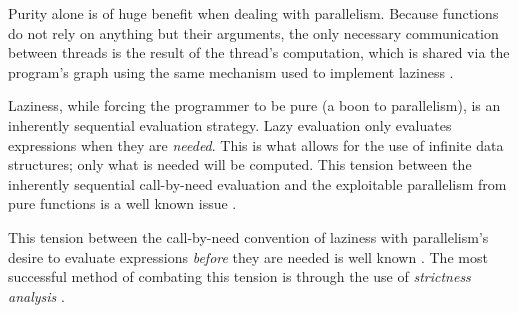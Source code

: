 
Purity alone is of huge benefit when dealing with parallelism. Because
functions do not rely on anything but their arguments, the only necessary communication
between threads is the result of the thread's computation, which is
shared via the program's graph using the same mechanism used to implement
laziness \citep{SPJ:PIFPL}.

Laziness, while forcing the programmer to be pure (a boon to
parallelism), is an inherently sequential evaluation strategy. Lazy evaluation
only evaluates expressions when they are \emph{needed}. This is what allows for
the use of infinite data structures; only what is needed will be computed.
This tension between the inherently sequential call-by-need evaluation and the
exploitable parallelism from pure functions is a well known issue
\citep{tremblay1995impact}.

This tension between the call-by-need convention of laziness with parallelism's
desire to evaluate expressions \emph{before} they are needed is well known
\citep{tremblay1995impact}. The most successful method of combating this tension
is through the use of \emph{strictness analysis} \citep{mycroft1980theory,
wadler1987projections, hinze1995projection}.
